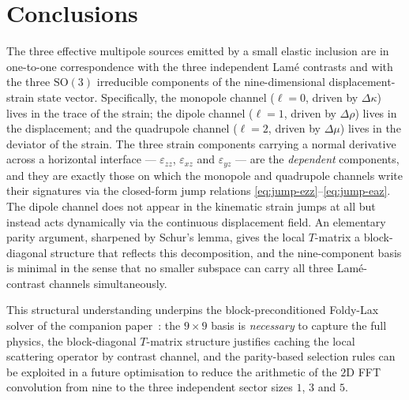 \documentclass[11pt,a4paper]{article}
\newcommand{\eps}{\varepsilon}
\theoremstyle{plain}
\theoremstyle{definition}
\theoremstyle{remark}
\begin{document}
\section{Conclusions}\label{sec:conclusions}
The three effective multipole sources emitted by a small elastic
inclusion are in one-to-one correspondence with the three independent
Lam\'e contrasts and with the three $\mathrm{SO}(3)$ irreducible
components of the nine-dimensional displacement-strain state vector.
Specifically, the monopole channel ($\ell=0$, driven by
$\Delta\kappa$) lives in the trace of the strain; the dipole channel
($\ell=1$, driven by $\Delta\rho$) lives in the displacement; and the
quadrupole channel ($\ell=2$, driven by $\Delta\mu$) lives in the
deviator of the strain.  The three strain components carrying a
normal derivative across a horizontal interface --- $\eps_{zz}$,
$\eps_{xz}$ and $\eps_{yz}$ --- are the \emph{dependent} components,
and they are exactly those on which the monopole and quadrupole
channels write their signatures via the closed-form jump relations
\eqref{eq:jump-ezz}--\eqref{eq:jump-eaz}.  The dipole channel does not
appear in the kinematic strain jumps at all but instead acts
dynamically via the continuous displacement field.  An elementary
parity argument, sharpened by Schur's lemma, gives the local
$T$-matrix a block-diagonal structure that reflects this
decomposition, and the nine-component basis is minimal in the sense
that no smaller subspace can carry all three Lam\'e-contrast channels
simultaneously.

This structural understanding underpins the block-preconditioned
Foldy-Lax solver of the companion
paper~\cite{nestor2026blockfoldylax}: the $9\times 9$ basis is
\emph{necessary} to capture the full physics, the block-diagonal
$T$-matrix structure justifies caching the local scattering operator
by contrast channel, and the parity-based selection rules can be
exploited in a future optimisation to reduce the arithmetic of the
$2$D FFT convolution from nine to the three independent sector sizes
$1$, $3$ and $5$.
\end{document}
